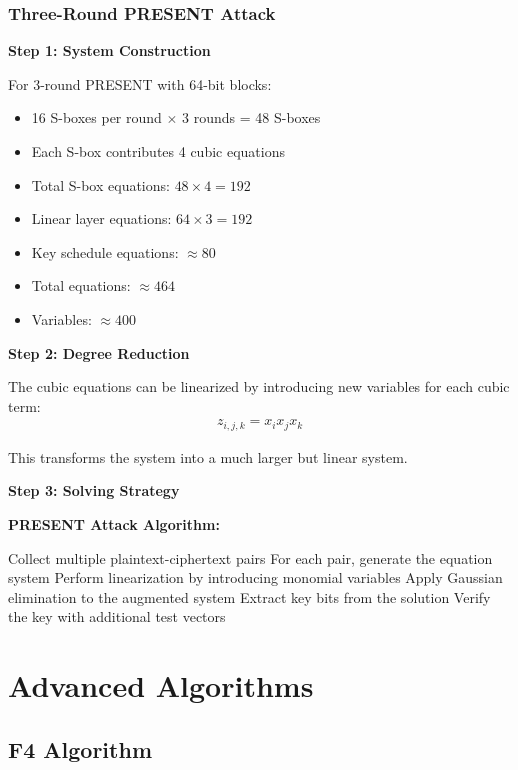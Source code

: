 \documentclass[12pt,a4paper]{article}
\begin{document}
\subsubsection{Three-Round PRESENT Attack}

\textbf{Step 1: System Construction}

For 3-round PRESENT with 64-bit blocks:
\begin{itemize}
    \item 16 S-boxes per round $\times$ 3 rounds = 48 S-boxes
    \item Each S-box contributes 4 cubic equations
    \item Total S-box equations: $48 \times 4 = 192$
    \item Linear layer equations: $64 \times 3 = 192$
    \item Key schedule equations: $\approx 80$
    \item Total equations: $\approx 464$
    \item Variables: $\approx 400$
\end{itemize}

\textbf{Step 2: Degree Reduction}

The cubic equations can be linearized by introducing new variables for each cubic term:
\begin{align}
z_{i,j,k} = x_i x_j x_k
\end{align}

This transforms the system into a much larger but linear system.

\textbf{Step 3: Solving Strategy}

\begin{algorithmbox}
\textbf{PRESENT Attack Algorithm:}
\begin{algorithmic}[1]
\STATE Collect multiple plaintext-ciphertext pairs
\STATE For each pair, generate the equation system
\STATE Perform linearization by introducing monomial variables
\STATE Apply Gaussian elimination to the augmented system
\STATE Extract key bits from the solution
\STATE Verify the key with additional test vectors
\end{algorithmic}
\end{algorithmbox}

\section{Advanced Algorithms}

\subsection{F4 Algorithm}
\end{document}

